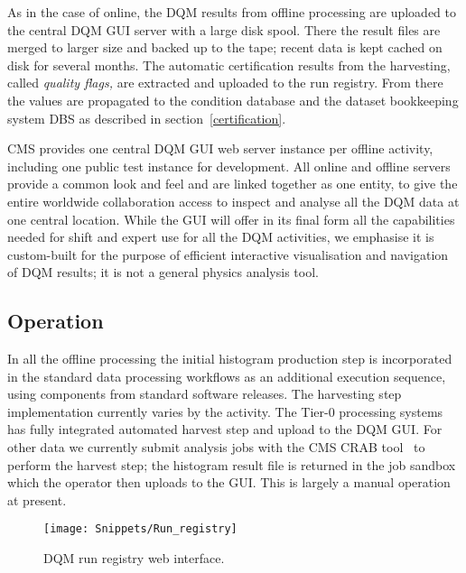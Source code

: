 \documentclass[a4paper]{jpconf}
\begin{document}
As in the case of online, the DQM results from offline processing are uploaded
to the central DQM GUI server with a large disk spool.  There the result files
are merged to larger size and backed up to the tape; recent data is kept
cached on disk for several months.  The automatic certification results from
the harvesting, called {\em quality flags,} are extracted and uploaded to the
run registry.  From there the values are propagated to the condition database
and the dataset bookkeeping system DBS as described in
section~\ref{certification}.

CMS provides one central DQM GUI web server instance per offline activity,
including one public test instance for development.  All online and offline
servers provide a common look and feel and are linked together as one entity,
to give the entire worldwide collaboration access to inspect and analyse all
the DQM data at one central location.  While the GUI will offer in its final
form all the capabilities needed for shift and expert use for all the DQM
activities, we emphasise it is custom-built for the purpose of efficient
interactive visualisation and navigation of DQM results; it is not a general
physics analysis tool.

\subsection{Operation}

In all the offline processing the initial histogram production step is
incorporated in the standard data processing workflows as an additional
execution sequence, using components from standard software releases.  The
harvesting step implementation currently varies by the activity.  The Tier-0
processing systems has fully integrated automated harvest step and upload to
the DQM GUI.  For other data we currently submit analysis jobs with the CMS
CRAB tool~\cite{cms_crab_07} to perform the harvest step; the histogram
result file is returned in the job sandbox which the operator then uploads
to the GUI.  This is largely a manual operation at present.


\begin{figure}[!tbp]
\begin{center}
\texttt{[image: Snippets/Run\_registry]}
\caption{\label{fig:runregistry}DQM run registry web interface.}
\end{center}
\end{figure}
\end{document}
